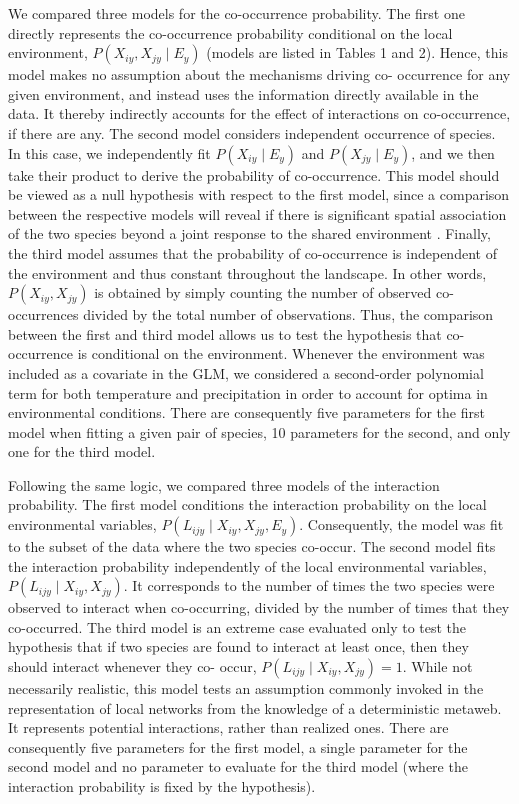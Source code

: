 \documentclass[12pt]{article}
\begin{document}
We compared three models for the co-occurrence probability. The first one
directly represents the co-occurrence probability conditional on the local
environment, $P(X_{iy},X_{jy}\mid E_y)$ (models are listed in Tables 1 and 2).
Hence, this model makes no assumption about the mechanisms driving co-
occurrence for any given environment, and instead uses the information
directly available in the data. It thereby indirectly accounts for the effect
of interactions on co-occurrence, if there are any. The second model considers
independent occurrence of species. In this case, we independently fit
$P(X_{iy} \mid E_y)$ and $P(X_{jy} \mid E_y)$, and we then take their product to
derive the probability of co-occurrence. This model should be viewed as a null
hypothesis with respect to the first model, since a comparison between the
respective models will reveal if there is significant spatial association of
the two species beyond a joint response to the shared environment
\citep{Cazelles2016}. Finally, the third model assumes that the probability of
co-occurrence is independent of the environment and thus constant throughout
the landscape. In other words, $P(X_{iy},X_{jy})$ is obtained by simply
counting the number of observed co-occurrences divided by the total number of
observations. Thus, the comparison between the first and third model allows us
to test the hypothesis that co-occurrence is conditional on the environment.
Whenever the environment was included as a covariate in the GLM, we considered
a second-order polynomial term for both temperature and precipitation in order
to account for optima in environmental conditions. There are consequently five
parameters for the first model when fitting a given pair of species, 10
parameters for the second, and only one for the third model.

Following the same logic, we compared three models of the interaction
probability. The first model conditions the interaction probability on the
local environmental variables, $P(L_{ijy}\mid X_{iy},X_{jy},E_y)$. Consequently,
the model was fit to the subset of the data where the two species co-occur.
The second model fits the interaction probability independently of the local
environmental variables, $P(L_{ijy}\mid X_{iy},X_{jy})$. It corresponds to the
number of times the two species were observed to interact when co-occurring,
divided by the number of times that they co-occurred. The third model is an
extreme case evaluated only to test the hypothesis that if two species are
found to interact at least once, then they should interact whenever they co-
occur, $P(L_{ijy}\mid X_{iy},X_{jy})=1$. While not necessarily realistic, this
model tests an assumption commonly invoked in the representation of local
networks from the knowledge of a deterministic metaweb. It represents
potential interactions, rather than realized ones. There are consequently five
parameters for the first model, a single parameter for the second model and no
parameter to evaluate for the third model (where the interaction probability
is fixed by the hypothesis).
\end{document}
